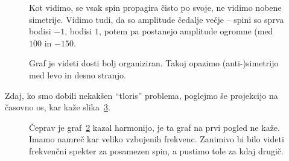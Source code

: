 \documentclass[12pt, a4 paper]{article}
\begin{document}
\begin{figure}[H]\centering
	
	\vspace{-32pt}
	\caption{Kot vidimo, se vsak spin propagira \v cisto po svoje, ne vidimo nobene simetrije. Vidimo tudi, da so
		amplitude \v cedalje ve\v cje -- spini so sprva bodisi $-1$, bodisi $1$, potem pa postanejo amplitude
		ogromne (med $100$ in $-150$.}
	\label{fail}
\end{figure}

\begin{figure}[H]\centering
	
	\vspace{-32pt}
	\caption{Graf je videti dosti bolj organiziran. Takoj opazimo (anti-)simetrijo med levo in desno stranjo.}
	\label{bravo}
\end{figure}

Zdaj, ko smo dobili nekak\v sen "`tloris"' problema, poglejmo \v se projekcijo na \v casovno os, kar ka\v ze
slika~\ref{spini}.

\begin{figure}[H]\centering
	
	\caption{\v Ceprav je graf~\ref{bravo} kazal harmonijo, je ta graf na prvi pogled ne ka\v ze. Imamo namre\v c
		kar veliko vzbujenih frekvenc. Zanimivo bi bilo videti frekven\v cni spekter za posamezen spin, a
		pustimo tole za kdaj drugi\v c.}
	\label{spini}
\end{figure}
\end{document}
